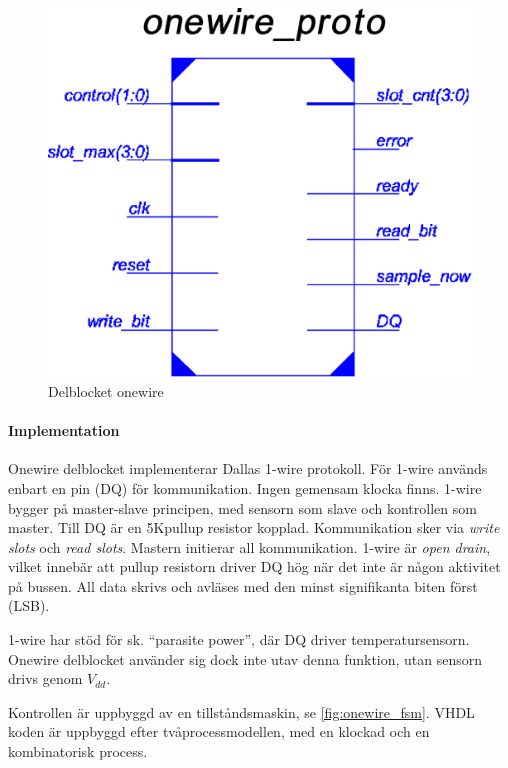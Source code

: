 \begin{figure}[H]
	\centering
	\includegraphics[scale=0.5]{onewire_sch.eps}
	\caption{Delblocket onewire}
\end{figure}

\paragraph{Implementation}
Onewire delblocket implementerar Dallas 1-wire protokoll. För 1-wire används enbart en pin (DQ) för kommunikation. Ingen gemensam klocka finns. 1-wire bygger på master-slave principen, med sensorn som slave och kontrollen som master. Till DQ är en 5K\ohm pullup resistor kopplad. Kommunikation sker via \emph{write slots} och \emph{read slots}. Mastern initierar all kommunikation. 1-wire är \emph{open drain}, vilket innebär att pullup resistorn driver DQ hög när det inte är någon aktivitet på bussen. All data skrivs och avläses med den minst signifikanta biten först (LSB).

1-wire har stöd för sk. ``parasite power'', där DQ driver temperatursensorn. Onewire delblocket använder sig dock inte utav denna funktion, utan sensorn drivs genom $V_{dd}$.

Kontrollen är uppbyggd av en tillståndsmaskin, se \autoref{fig:onewire_fsm}. VHDL koden är uppbyggd efter tvåprocessmodellen, med en klockad och en kombinatorisk process.

